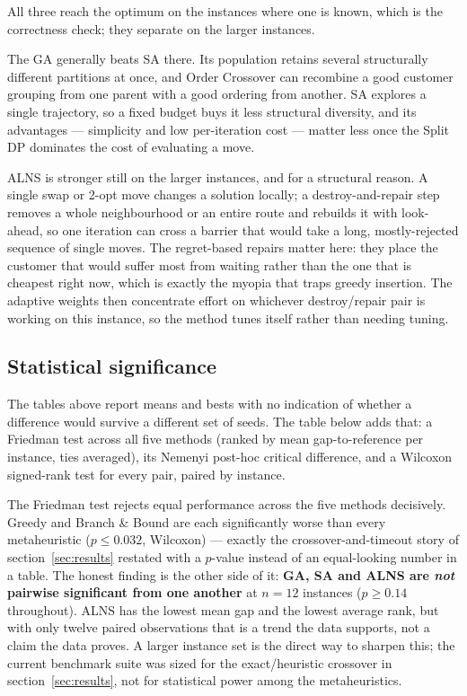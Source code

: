 \documentclass[11pt,a4paper]{article}
\begin{document}
All three reach the optimum on the instances where one is known, which is the
correctness check; they separate on the larger instances.

The GA generally beats SA there. Its population retains several structurally
different partitions at once, and Order Crossover can recombine a good customer
grouping from one parent with a good ordering from another. SA explores a single
trajectory, so a fixed budget buys it less structural diversity, and its
advantages --- simplicity and low per-iteration cost --- matter less once the
Split DP dominates the cost of evaluating a move.

ALNS is stronger still on the larger instances, and for a structural reason. A
single swap or 2-opt move changes a solution locally; a destroy-and-repair step
removes a whole neighbourhood or an entire route and rebuilds it with look-ahead,
so one iteration can cross a barrier that would take a long, mostly-rejected
sequence of single moves. The regret-based repairs matter here: they place the
customer that would suffer most from waiting rather than the one that is cheapest
right now, which is exactly the myopia that traps greedy insertion. The adaptive
weights then concentrate effort on whichever destroy/repair pair is working on
this instance, so the method tunes itself rather than needing tuning.

\subsection{Statistical significance}
\label{sec:significance}

The tables above report means and bests with no indication of whether a
difference would survive a different set of seeds. The table below adds that:
a Friedman test across all five methods (ranked by mean gap-to-reference per
instance, ties averaged), its Nemenyi post-hoc critical difference, and a
Wilcoxon signed-rank test for every pair, paired by instance.

\begin{center}
\footnotesize

\end{center}

The Friedman test rejects equal performance across the five methods
decisively. Greedy and Branch \& Bound are each significantly worse than every
metaheuristic ($p \le 0.032$, Wilcoxon) --- exactly the crossover-and-timeout
story of section~\ref{sec:results} restated with a $p$-value instead of an
equal-looking number in a table. The honest finding is the other side of it:
\textbf{GA, SA and ALNS are \emph{not} pairwise significant from one another}
at $n = 12$ instances ($p \ge 0.14$ throughout). ALNS has the lowest mean gap
and the lowest average rank, but with only twelve paired observations that
is a trend the data supports, not a claim the data proves. A larger instance
set is the direct way to sharpen this; the current benchmark suite was sized
for the exact/heuristic crossover in section~\ref{sec:results}, not for
statistical power among the metaheuristics.
\end{document}
